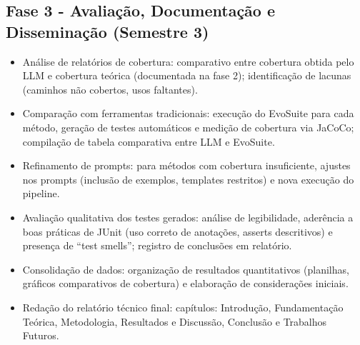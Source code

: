     \subsection{Fase 3 - Avaliação, Documentação e Disseminação (Semestre 3)}
        \begin{itemize}
            \item Análise de relatórios de cobertura: comparativo entre cobertura obtida pelo LLM e cobertura teórica (documentada na fase 2); identificação de lacunas (caminhos não cobertos, usos faltantes).
            \item Comparação com ferramentas tradicionais: execução do EvoSuite \cite{fraser2011evosuite} para cada método, geração de testes automáticos e medição de cobertura via JaCoCo; compilação de tabela comparativa entre LLM e EvoSuite.
            \item Refinamento de prompts: para métodos com cobertura insuficiente, ajustes nos prompts (inclusão de exemplos, templates restritos) e nova execução do pipeline.
            \item Avaliação qualitativa dos testes gerados: análise de legibilidade, aderência a boas práticas de JUnit (uso correto de anotações, asserts descritivos) e presença de ``test smells''; registro de conclusões em relatório.
            \item Consolidação de dados: organização de resultados quantitativos (planilhas, gráficos comparativos de cobertura) e elaboração de considerações iniciais.
            \item Redação do relatório técnico final: capítulos: Introdução, Fundamentação Teórica, Metodologia, Resultados e Discussão, Conclusão e Trabalhos Futuros.
        \end{itemize}